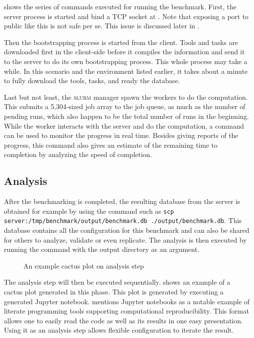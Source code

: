  shows the series of commands executed for running the benchmark.
First, the server process is started and bind a TCP socket at .
Note that exposing a port to public like this is not safe per se.
This issue is discussed later in .

Then the bootstrapping process is started from the client.
Tools and tasks are downloaded first in the client-side before it compiles the information and send it to the server to do its own bootstrapping process.
This whole process may take a while.
In this scenario and the environment listed earlier, it takes about a minute to fully download the tools, tasks, and ready the database.

Last but not least, the \textsc{slurm} manager spawn the workers to do the computation.
This submits a 5,304-sized job array to the job queue, as much as the number of pending runs, which also happen to be the total number of runs in the beginning.
While the worker interacts with the server and do the computation, a  command can be used to monitor the progress in real time.
Besides giving reports of the progress, this command also gives an estimate of the remaining time to completion by analyzing the speed of completion.

\subsection{Analysis}

After the benchmarking is completed, the resulting database from the server is obtained for example by using the  command such as \texttt{scp server:/tmp/benchmark/output/benchmark.db ./output/benchmark.db}.
This database contains all the configuration for this benchmark and can also be shared for others to analyze, validate or even replicate.
The analysis is then executed by running the  command with the output directory as an argument.

\begin{figure}
	\centering
	\caption{An example cactus plot on analysis step}
	\label{fig:eval.cactus}
\end{figure}

The analysis step will then be executed sequentially.
 shows an example of a cactus plot generated in this phase.
This plot is generated by executing a generated Jupyter notebook.
\citet{piccoloToolsTechniquesComputational2016} mentions Jupyter notebooks as a notable example of literate programming tools supporting computational reproducibility.
This format allows one to easily read the code as well as its results in one easy presentation.
Using it as an analysis step allows flexible configuration to iterate the result.

